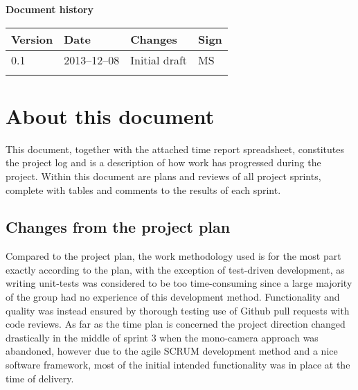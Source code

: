 \documentclass[10pt, a4paper, twoside]{article}
\begin{document}



\newpage
\pagestyle{fancy}
\setcounter{page}{2} %



\newpage
\tableofcontents
\listoffigures


\newpage
\vspace*{5\baselineskip}

\begin{center}
\textbf{\LARGE Document history}

{ \footnotesize 
\begin{tabular}{|p{1cm}|p{2.0cm}|p{6.5cm}|p{2cm}|}
	\hline
	\textbf{Version} & \textbf{Date} & \textbf{Changes} & \textbf{Sign} \\
	
	\hline
	0.1 & 2013--12--08 & Initial draft & MS \\
	\hline
	 &  &  &   \\
	
	\hline
\end{tabular}
}
\end{center}

\vspace{2cm}

\section{About this document}
\label{sec:about}
This document, together with the attached time report spreadsheet, constitutes the project log and is a description of how work has progressed during the project. Within this document are plans and reviews of all project sprints, complete with tables and comments to the results of each sprint.

\subsection{Changes from the project plan}
Compared to the project plan, the work methodology used is for the most part exactly according to the plan, with the exception of test-driven development, as writing unit-tests was considered to be too time-consuming since a large majority of the group had no experience of this development method. Functionality and quality was instead ensured by thorough testing use of Github pull requests with code reviews. As far as the time plan is concerned the project direction changed drastically in the middle of sprint 3 when the mono-camera approach was abandoned, however due to the agile SCRUM development method and a nice software framework, most of the initial intended functionality was in place at the time of delivery.


%
%
\newpage

\newpage

\newpage

\newpage

\newpage

\end{document}
